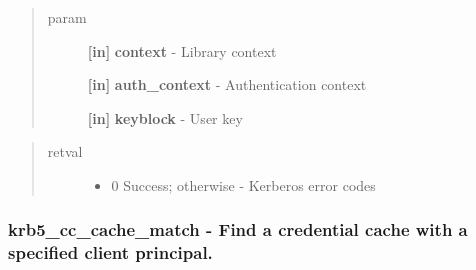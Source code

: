 \documentclass[letterpaper,10pt,english]{sphinxmanual}
\begin{document}
\begin{quote}\begin{description}
\item[{param}] \leavevmode
\textbf{{[}in{]}} \textbf{context} - Library context

\textbf{{[}in{]}} \textbf{auth\_context} - Authentication context

\textbf{{[}in{]}} \textbf{keyblock} - User key

\end{description}\end{quote}
\begin{quote}\begin{description}
\item[{retval}] \leavevmode\begin{itemize}
\item {} 
0   Success; otherwise - Kerberos error codes

\end{itemize}

\end{description}\end{quote}


\subsubsection{krb5\_cc\_cache\_match -  Find a credential cache with a specified client principal.}
\label{appdev/refs/api/krb5_cc_cache_match:krb5-cc-cache-match-find-a-credential-cache-with-a-specified-client-principal}\label{appdev/refs/api/krb5_cc_cache_match::doc}

\begin{fulllineitems}
\label{appdev/refs/api/krb5_cc_cache_match:krb5_cc_cache_match}
\end{fulllineitems}
\end{document}
